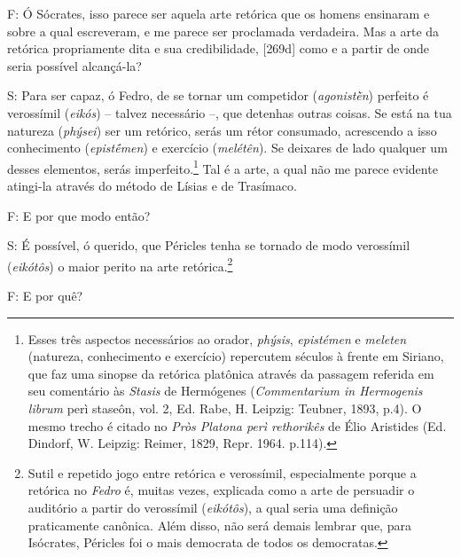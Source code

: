 F: Ó Sócrates, isso parece ser aquela arte retórica que os homens
ensinaram e sobre a qual escreveram, e me parece ser proclamada
verdadeira. Mas a arte da retórica propriamente dita e sua
credibilidade, {[}269d{]} como e a partir de onde seria possível
alcançá-la?

S: Para ser capaz, ó Fedro, de se tornar um competidor
(\emph{agonistḕn}) perfeito é verossímil (\emph{eikós}) -- talvez
necessário --, que detenhas outras coisas. Se está na tua natureza
(\emph{phýsei}) ser um retórico, serás um rétor consumado, acrescendo a
isso conhecimento (\emph{epistḗmen}) e exercício (\emph{melétên}). Se
deixares de lado qualquer um desses elementos, serás
imperfeito.\footnote{Esses três aspectos necessários ao orador,
  \emph{phýsis}, \emph{epistémen} e \emph{meleten} (natureza,
  conhecimento e exercício) repercutem séculos à frente em Siriano, que
  faz uma sinopse da retórica platônica através da passagem referida em
  seu comentário às \emph{Stasis} de Hermógenes (\emph{Commentarium in
  Hermogenis librum} perì staseôn, vol. 2, Ed. Rabe, H. Leipzig:
  Teubner, 1893, p.4). O mesmo trecho é citado no \emph{Pròs Platona
  perì rethorikês} de Élio Aristides (Ed. Dindorf, W. Leipzig: Reimer,
  1829, Repr. 1964. p.114).} Tal é a arte, a qual não me parece evidente
atingi-la através do método de Lísias e de Trasímaco.

F: E por que modo então?

S: É possível, ó querido, que Péricles tenha se tornado de modo
verossímil (\emph{eikótôs}) o maior perito na arte retórica.\footnote{Sutil
  e repetido jogo entre retórica e verossímil, especialmente porque a
  retórica no \emph{Fedro} é, muitas vezes, explicada como a arte de
  persuadir o auditório a partir do verossímil (\emph{eikótôs}), a qual
  seria uma definição praticamente canônica. Além disso, não será demais
  lembrar que, para Isócrates, Péricles foi o mais democrata de todos os
  democratas.}

F: E por quê?


